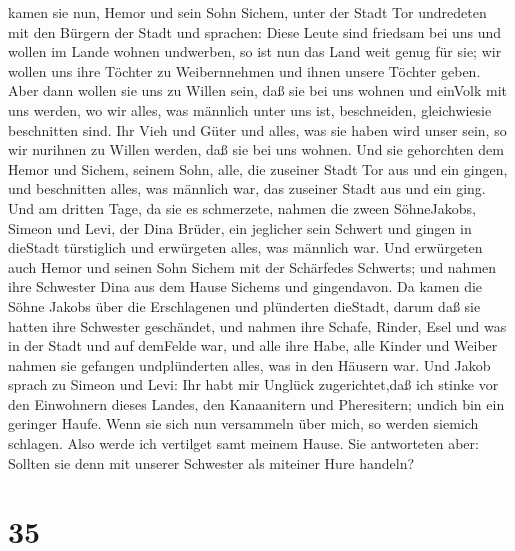 kamen sie nun, Hemor und sein Sohn Sichem, unter der Stadt Tor
undredeten mit den Bürgern der Stadt und sprachen:  Diese
Leute sind friedsam bei uns und wollen im Lande wohnen undwerben, so ist
nun das Land weit genug für sie; wir wollen uns ihre Töchter zu
Weibernnehmen und ihnen unsere Töchter geben.  Aber dann
wollen sie uns zu Willen sein, daß sie bei uns wohnen und einVolk mit
uns werden, wo wir alles, was männlich unter uns ist, beschneiden,
gleichwiesie beschnitten sind.  Ihr Vieh und Güter und
alles, was sie haben wird unser sein, so wir nurihnen zu Willen werden,
daß sie bei uns wohnen.  Und sie gehorchten dem Hemor und
Sichem, seinem Sohn, alle, die zuseiner Stadt Tor aus und ein gingen,
und beschnitten alles, was männlich war, das zuseiner Stadt aus und ein
ging.  Und am dritten Tage, da sie es schmerzete, nahmen
die zween SöhneJakobs, Simeon und Levi, der Dina Brüder, ein jeglicher
sein Schwert und gingen in dieStadt türstiglich und erwürgeten alles,
was männlich war.  Und erwürgeten auch Hemor und seinen
Sohn Sichem mit der Schärfedes Schwerts; und nahmen ihre Schwester Dina
aus dem Hause Sichems und gingendavon.  Da kamen die Söhne
Jakobs über die Erschlagenen und plünderten dieStadt, darum daß sie
hatten ihre Schwester geschändet,  und nahmen ihre Schafe,
Rinder, Esel und was in der Stadt und auf demFelde war, 
und alle ihre Habe, alle Kinder und Weiber nahmen sie gefangen
undplünderten alles, was in den Häusern war.  Und Jakob
sprach zu Simeon und Levi: Ihr habt mir Unglück zugerichtet,daß ich
stinke vor den Einwohnern dieses Landes, den Kanaanitern und
Pheresitern; undich bin ein geringer Haufe. Wenn sie sich nun versammeln
über mich, so werden siemich schlagen. Also werde ich vertilget samt
meinem Hause.  Sie antworteten aber: Sollten sie denn mit
unserer Schwester als miteiner Hure handeln?

\hypertarget{section-34}{%
\section{35}\label{section-34}}

